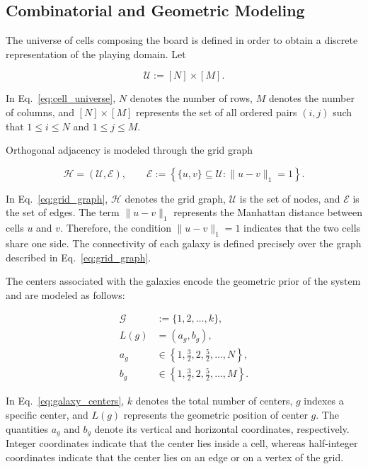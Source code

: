 \subsection{Combinatorial and Geometric Modeling}

The universe of cells composing the board is defined in order to obtain a discrete representation of the playing domain. Let

\begin{equation}
\mathcal{U} := [N] \times [M].
\label{eq:cell_universe}
\end{equation}

In Eq.~\ref{eq:cell_universe}, \(N\) denotes the number of rows, \(M\) denotes the number of columns, and \([N] \times [M]\) represents the set of all ordered pairs \((i,j)\) such that \(1 \leq i \leq N\) and \(1 \leq j \leq M\).

Orthogonal adjacency is modeled through the grid graph

\begin{equation}
\mathcal{H} = (\mathcal{U}, \mathcal{E}), 
\qquad 
\mathcal{E} := \left\{ \{u,v\} \subseteq \mathcal{U} : \|u-v\|_{1} = 1 \right\}.
\label{eq:grid_graph}
\end{equation}

In Eq.~\ref{eq:grid_graph}, \(\mathcal{H}\) denotes the grid graph, \(\mathcal{U}\) is the set of nodes, and \(\mathcal{E}\) is the set of edges. The term \(\|u-v\|_{1}\) represents the Manhattan distance between cells \(u\) and \(v\). Therefore, the condition \(\|u-v\|_{1}=1\) indicates that the two cells share one side. The connectivity of each galaxy is defined precisely over the graph described in Eq.~\ref{eq:grid_graph}.

The centers associated with the galaxies encode the geometric prior of the system and are modeled as follows:

\begin{equation}
\begin{aligned}
\mathcal{G} &:= \{1,2,\ldots,k\}, \\
L(g) &= (a_g,b_g), \\
a_g &\in \left\{1,\tfrac{3}{2},2,\tfrac{5}{2},\ldots,N\right\}, \\
b_g &\in \left\{1,\tfrac{3}{2},2,\tfrac{5}{2},\ldots,M\right\}.
\end{aligned}
\label{eq:galaxy_centers}
\end{equation}

In Eq.~\ref{eq:galaxy_centers}, \(k\) denotes the total number of centers, \(g\) indexes a specific center, and \(L(g)\) represents the geometric position of center \(g\). The quantities \(a_g\) and \(b_g\) denote its vertical and horizontal coordinates, respectively. Integer coordinates indicate that the center lies inside a cell, whereas half-integer coordinates indicate that the center lies on an edge or on a vertex of the grid.

